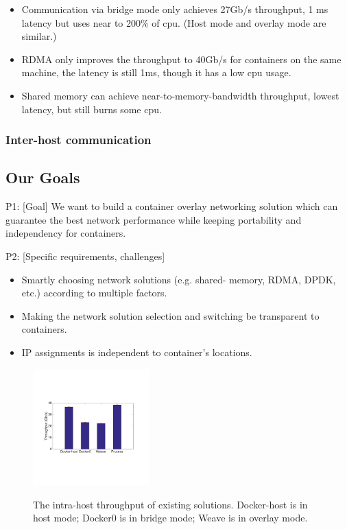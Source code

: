 \begin{itemize}
  \item Communication via bridge mode only achieves 27Gb/s throughput, 1 ms latency but uses near to 200\% of cpu. (Host mode and overlay mode are similar.)
  \item RDMA only improves the throughput to 40Gb/s for containers on the same machine, the latency is still 1ms, though it has a low cpu usage.
  \item Shared memory can achieve near-to-memory-bandwidth throughput, lowest latency, but still burns some cpu. 
\end{itemize}


\subsubsection{Inter-host communication}


\subsection{Our Goals}
P1: [Goal] We want to build a container overlay networking solution which can guarantee the best network performance while keeping portability and independency for containers.

P2: [Specific requirements, challenges]
\begin{itemize}
  \item Smartly choosing network solutions (e.g. shared- memory, RDMA, DPDK, etc.) according to multiple factors.
  \item Making the network solution selection and switching be transparent to containers.
  \item IP assignments is independent to container's locations.
\end{itemize}

\iffalse

\begin{figure}[ht]
     \centering 
     \includegraphics[width=0.4\textwidth]{figures/motivation/eval_exist_bw.pdf} 
     \label{fig:eval_exist_bw}
     \caption{The intra-host throughput of existing solutions. Docker-host is in host mode; Docker0 is in bridge mode; Weave is in overlay mode.} 
\end{figure} 

